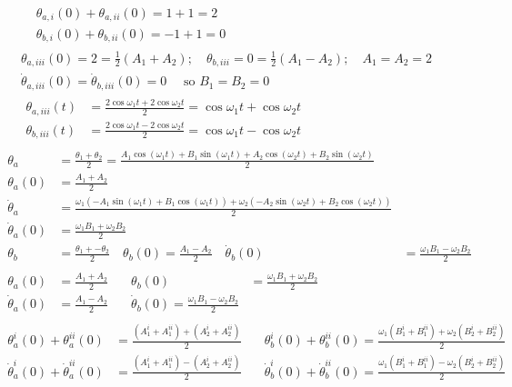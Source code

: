 \documentclass[twoside,10pt]{amsart}
\begin{document}
\[
\begin{gathered}
  \begin{aligned}
    & \theta_{a,i}(0) + \theta_{a,ii}(0) = 1 + 1 = 2 \\
    & \theta_{b,i}(0) + \theta_{b,ii}(0) = -1 + 1 = 0 
  \end{aligned} \\
  \theta_{a,iii}(0) = 2 = \frac{1}{2} (A_1 + A_2) ; \quad \theta_{b,iii} = 0 = \frac{1}{2} (A_1 - A_2) ; \quad A_1 = A_2 = 2 \\
  \dot{\theta}_{a,iii}(0) = \dot{\theta}_{b,iii}(0) = 0 \quad \text{ so } B_1 = B_2 = 0 \\
  \begin{aligned}
    \theta_{a,iii}(t) & = \frac{2 \cos{ \omega_1 t } + 2 \cos{ \omega_2 t } }{ 2 }  = \cos{\omega_1 t } + \cos{ \omega_2 t} \\
    \theta_{b,iii}(t) & = \frac{2 \cos{ \omega_1 t } - 2 \cos{ \omega_2 t } }{ 2 }  = \cos{\omega_1 t } - \cos{ \omega_2 t}
\end{aligned}
\end{gathered}
\]
\[
\begin{gathered}
  \begin{aligned}
    \theta_a & = \frac{ \theta_1 + \theta_2 }{ 2 } = \frac{ A_1 \cos{ (\omega_1 t ) } + B_1 \sin{ (\omega_1 t ) } + A_2 \cos{ (\omega_2 t ) } + B_2 \sin{ (\omega_2 t ) } }{ 2 } \\
    \theta_a(0) & = \frac{ A_1 + A_2 }{ 2 } \\
    \dot{\theta}_a & = \frac{ \omega_1 ( -A_1 \sin{ (\omega_1 t ) } + B_1 \cos{ (\omega_1 t ) }  ) + \omega_2 (-A_2 \sin{ (\omega_2 t ) } + B_2 \cos{ (\omega_2 t ) } ) }{ 2 } \\
    \dot{\theta}_a(0) & = \frac{ \omega_1 B_1 + \omega_2 B_2 }{ 2 } \\
    \theta_b & = \frac{ \theta_1 + -\theta_2 }{ 2 } \quad \theta_b(0)  = \frac{A_1 -A_2 }{2} \quad \dot{\theta}_b(0) & = \frac{ \omega_1 B_1 - \omega_2 B_2}{2 } 
\end{aligned} \\
  \begin{aligned}
    \theta_a(0) & = \frac{A_1 + A_2}{2} \quad & \theta_b(0) & = \frac{ \omega_1 B_1 + \omega_2 B_2 }{ 2 } \\
    \dot{\theta}_a(0) & = \frac{A_1 -A_2}{2} \quad & \dot{\theta}_b(0) = \frac{ \omega_1 B_1 - \omega_2 B_2}{ 2 } 
\end{aligned} \\
  \begin{aligned}
    \theta_a^i(0) + \theta_a^{ii}(0) & = \frac{ (A_1^i + A_1^{ii} ) + (A_2^i + A_2^{ii}) }{ 2 } \quad & \theta_b^i(0) + \theta_b^{ii}(0)  = \frac{ \omega_1 (B_1^i + B_1^{ii}) + \omega_2 ( B_2^i + B_2^{ii} ) }{ 2 } \\
    \dot{\theta}_a^i(0) + \dot{\theta}_a^{ii}(0) & = \frac{ (A_1^i + A_1^{ii} ) - (A_2^i + A_2^{ii}) }{ 2 } \quad & \dot{\theta}_b^i(0) + \dot{\theta}_b^{ii}(0)  = \frac{ \omega_1 (B_1^i + B_1^{ii}) - \omega_2 ( B_2^i + B_2^{ii} ) }{ 2 } 
    \end{aligned}
\end{gathered}
\]
\end{document}
